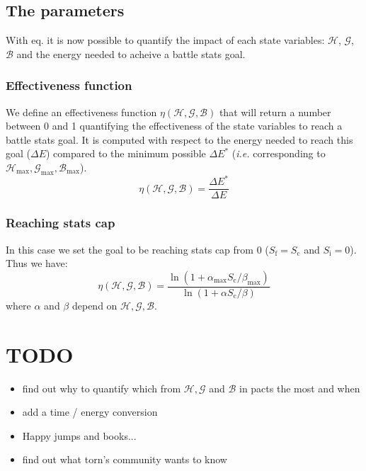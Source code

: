 \documentclass[12pt]{article}
\def\Ef{\eta}
\def\happy{\mathcal{H}}
\def\gym{\mathcal{G}}
\def\bonus{\mathcal{B}}
\def\Sc{S_\text{c}}
\def\Si{S_\text{i}}
\def\Sf{S_\text{f}}
\begin{document}
\subsection{The parameters}
With eq.\label{eq:de-s-general} it is now possible to quantify the impact of each state variables: $\happy$, $\gym$, $\bonus$ and the energy needed to acheive a battle stats goal.

\subsubsection{Effectiveness function}
We define an effectiveness function $\Ef(\happy, \gym, \bonus)$ that will return a number between 0 and 1 quantifying the effectiveness of the state variables to reach a battle stats goal. It is computed with respect to the energy needed to reach this goal ($\Delta E$) compared to the minimum possible $\Delta E^*$ ({\it i.e.} corresponding to $\happy_\text{max}, \gym_\text{max}, \bonus_\text{max}$).
\begin{equation}
    \Ef(\happy, \gym, \bonus) = \frac{\Delta E^*}{\Delta E}
\end{equation}

\subsubsection{Reaching stats cap}
In this case we set the goal to be reaching stats cap from 0 ($\Sf =\Sc$ and $\Si = 0$). Thus we have:
\begin{equation}
    \Ef(\happy, \gym, \bonus) = \frac{ \ln\left( 1 + \alpha_\text{max}\Sc/\beta_\text{max} \right) }{ \ln\left( 1 + \alpha\Sc/\beta \right) }
\end{equation}
where $\alpha$ and $\beta$ depend on $\happy, \gym, \bonus$.

\section{TODO}
\begin{itemize}
    \item find out why to quantify which from $\happy, \gym$ and $\bonus$ in pacts the most and when
    \item add a time / energy conversion
    \item Happy jumps and books...
    \item find out what torn's community wants to know
\end{itemize}
\end{document}
